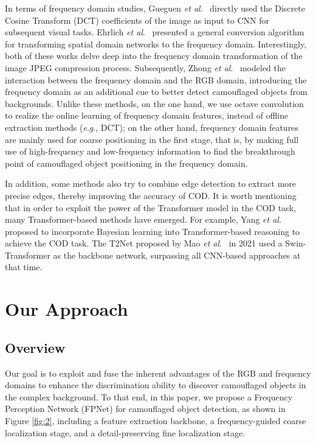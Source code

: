 \documentclass[sigconf,screen]{acmart}
\newcommand{\etal}{\textit{et al}.}
\newcommand{\eg}{\textit{e}.\textit{g}.}
\begin{document}
In terms of frequency domain studies, Gueguen \etal~\cite{r56} directly used the Discrete Cosine Transform (DCT) coefficients of the image as input to CNN for subsequent visual tasks. 
Ehrlich \etal~\cite{r57} presented a general conversion algorithm for transforming spatial domain networks to the frequency domain. Interestingly, both of these works delve deep into the frequency domain transformation of the image JPEG compression process. 
Subsequently, Zhong \etal~\cite{r39} modeled the interaction between the frequency domain and the RGB domain, introducing the frequency domain as an additional cue to better detect camouflaged objects from backgrounds. 
Unlike these methods, on the one hand, we use octave convolution to realize the online learning of frequency domain features, instead of offline extraction methods (\eg, DCT); on the other hand, frequency domain features are mainly used for coarse positioning in the first stage, that is, by making full use of high-frequency and low-frequency information to find the breakthrough point of camouflaged object positioning in the frequency domain.


In addition, some methods \cite{r10,r11,r12} also try to combine edge detection to extract more precise edges, thereby improving the accuracy of COD. It is worth mentioning that in order to exploit the power of the Transformer model in the COD task, many Transformer-based methods have emerged.
For example, Yang \etal~\cite{r17} proposed to incorporate Bayesian learning into Transformer-based reasoning to achieve the COD task. The T2Net proposed by Mao \etal~\cite{r61} in 2021 used a Swin-Transformer as the backbone network, surpassing all CNN-based approaches at that time. 



\section{Our Approach}
\subsection{Overview}
Our goal is to exploit and fuse the inherent advantages of the RGB and frequency domains to enhance the discrimination ability to discover camouflaged objects in the complex background. To that end, in this paper, we propose a Frequency Perception Network (FPNet) for camouflaged object detection, as shown in Figure \ref{fig:2}, including a feature extraction backbone, a frequency-guided coarse localization stage, and a detail-preserving fine localization stage.
\end{document}
